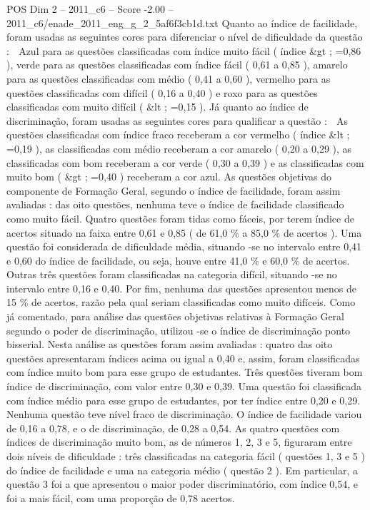 \begin{textsample}{POS Dim 2 – 2011\_c6 – Score -2.00 – 2011\_c6/enade\_2011\_eng\_g\_2\_5af6f3cb1d.txt}
Quanto ao índice de facilidade, foram usadas as seguintes cores para diferenciar o nível de dificuldade da questão :  Azul para as questões classificadas com índice muito fácil ( índice \&gt ; =0,86 ), verde para as questões classificadas com índice fácil ( 0,61 a 0,85 ), amarelo para as questões classificadas com médio ( 0,41 a 0,60 ), vermelho para as questões classificadas com difícil ( 0,16 a 0,40 ) e roxo para as questões classificadas com muito difícil ( \&lt ; =0,15 ).
Já quanto ao índice de discriminação, foram usadas as seguintes cores para qualificar a questão :  As questões classificadas com índice fraco receberam a cor vermelho ( índice \&lt ; =0,19 ), as classificadas com médio receberam a cor amarelo ( 0,20 a 0,29 ), as classificadas com bom receberam a cor verde ( 0,30 a 0,39 ) e as classificadas com muito bom ( \&gt ; =0,40 ) receberam a cor azul.
As questões objetivas do componente de Formação Geral, segundo o índice de facilidade, foram assim avaliadas : das oito questões, nenhuma teve o índice de facilidade classificado como muito fácil.
Quatro questões foram tidas como fáceis, por terem índice de acertos situado na faixa entre 0,61 e 0,85 ( de 61,0 \% a 85,0 \% de acertos ).
Uma questão foi considerada de dificuldade média, situando -se no intervalo entre 0,41 e 0,60 do índice de facilidade, ou seja, houve entre 41,0 \% e 60,0 \% de acertos.
Outras três questões foram classificadas na categoria difícil, situando -se no intervalo entre 0,16 e 0,40.
Por fim, nenhuma das questões apresentou menos de 15 \% de acertos, razão pela qual seriam classificadas como muito difíceis.
Como já comentado, para análise das questões objetivas relativas à Formação Geral segundo o poder de discriminação, utilizou -se o índice de discriminação ponto bisserial.
Nesta análise as questões foram assim avaliadas : quatro das oito questões apresentaram índices acima ou igual a 0,40 e, assim, foram classificadas com índice muito bom para esse grupo de estudantes.
Três questões tiveram bom índice de discriminação, com valor entre 0,30 e 0,39.
Uma questão foi classificada com índice médio para esse grupo de estudantes, por ter índice entre 0,20 e 0,29.
Nenhuma questão teve nível fraco de discriminação.
O índice de facilidade variou de 0,16 a 0,78, e o de discriminação, de 0,28 a 0,54.
As quatro questões com índices de discriminação muito bom, as de números 1, 2, 3 e 5, figuraram entre dois níveis de dificuldade : três classificadas na categoria fácil ( questões 1, 3 e 5 ) do índice de facilidade e uma na categoria médio ( questão 2 ).
Em particular, a questão 3 foi a que apresentou o maior poder discriminatório, com índice 0,54, e foi a mais fácil, com uma proporção de 0,78 acertos.

\end{textsample}

